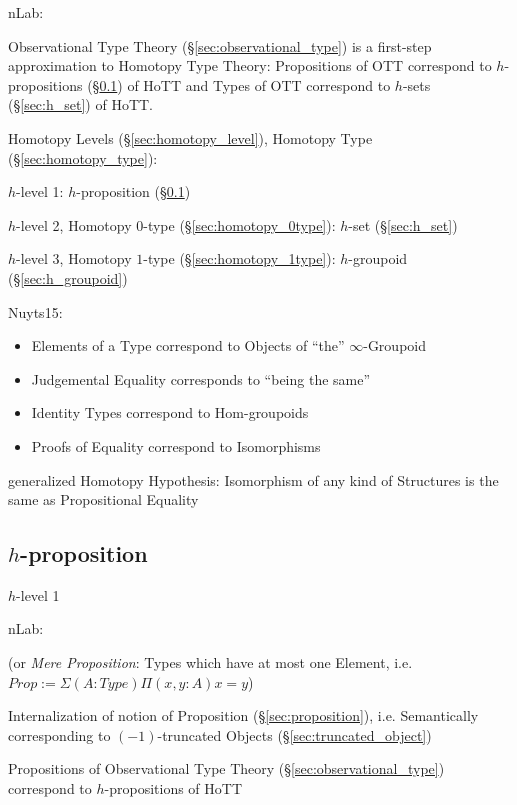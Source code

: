 nLab:

Observational Type Theory (\S\ref{sec:observational_type}) is a
first-step approximation to Homotopy Type Theory: Propositions of OTT
correspond to $h$-propositions (\S\ref{sec:h_proposition}) of HoTT and
Types of OTT correspond to $h$-sets (\S\ref{sec:h_set}) of HoTT.

Homotopy Levels (\S\ref{sec:homotopy_level}), Homotopy Type
(\S\ref{sec:homotopy_type}):

$h$-level 1: $h$-proposition (\S\ref{sec:h_proposition})

$h$-level 2, Homotopy $0$-type (\S\ref{sec:homotopy_0type}): $h$-set
(\S\ref{sec:h_set})

$h$-level 3, Homotopy $1$-type (\S\ref{sec:homotopy_1type}):
$h$-groupoid (\S\ref{sec:h_groupoid})


Nuyts15:

\begin{itemize}
  \item Elements of a Type correspond to Objects of ``the''
    $\infty$-Groupoid
  \item Judgemental Equality corresponds to ``being the same''
  \item Identity Types correspond to Hom-groupoids
  \item Proofs of Equality correspond to Isomorphisms
\end{itemize}

generalized Homotopy Hypothesis: Isomorphism of any kind of Structures
is the same as Propositional Equality



\subsection{$h$-proposition}\label{sec:h_proposition}

$h$-level 1

nLab:

(or \emph{Mere Proposition}: Types which have at most one Element,
i.e. $Prop := \Sigma(A : Type) \Pi(x, y : A) x = y$)

Internalization of notion of Proposition (\S\ref{sec:proposition}),
i.e. Semantically corresponding to $(-1)$-truncated Objects
(\S\ref{sec:truncated_object})

Propositions of Observational Type Theory
(\S\ref{sec:observational_type}) correspond to $h$-propositions of HoTT



